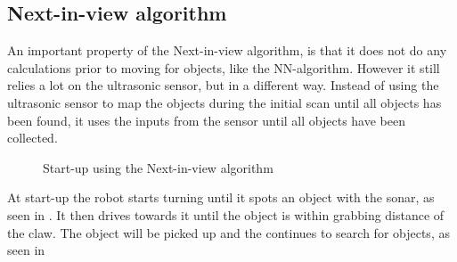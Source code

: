 \subsection{Next-in-view algorithm} \label{sec:niv-algorithm}
An important property of the Next-in-view algorithm, is that it does not do any calculations prior to moving for objects, like the NN-algorithm. However it still relies a lot on the ultrasonic sensor, but in a different way. Instead of using the ultrasonic sensor to map the objects during the initial scan until all objects has been found, it uses the inputs from the sensor until all objects have been collected.

\begin{figure}[H]
     \caption{\label{fig:object_navigation_niv} Start-up using the Next-in-view algorithm}
\end{figure}

At start-up the robot starts turning until it spots an object with the sonar, as seen in . It then drives towards it until the object is within grabbing distance of the claw. The object will be picked up and the \projname{} continues to search for objects, as seen in 

